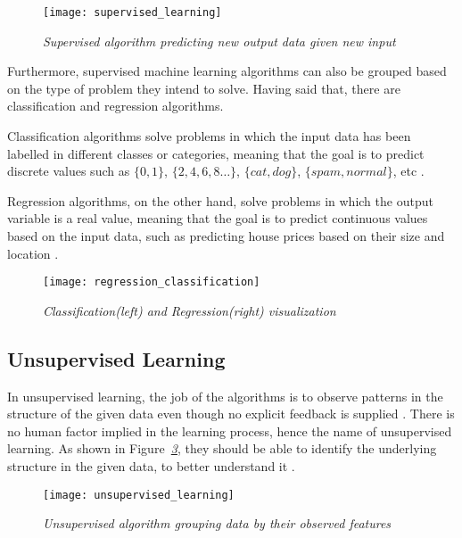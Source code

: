 \begin{figure}[h]
    \centering
    \texttt{[image: supervised\_learning]}
    \caption{\emph{Supervised algorithm predicting new output data given new input  \cite{typesML}}}
    \label{fig:supervised}
\end{figure}

Furthermore, supervised machine learning algorithms can also
be grouped based on the type of problem they intend to solve.
Having said that, there are classification and regression algorithms.

Classification algorithms solve problems in which the input data has
been labelled in different classes or categories,
meaning that the goal is to predict discrete values
such as $\{0, 1\}$, $\{2, 4, 6, 8\dots\}$, $\{cat, dog\}$, $\{spam, normal\}$, etc \cite{typesMLMedium}.

Regression algorithms, on the other hand, solve problems in which the output variable
is a real value, meaning that the goal is to predict continuous values based on the
input data, such as predicting house prices based on their size and location \cite{typesMLMedium}.

\begin{figure}[h]
    \centering
    \texttt{[image: regression\_classification]}
    \caption{\emph{Classification(left) and Regression(right) visualization  \cite{bigDataR}}}
    \label{fig:regression_classification}
\end{figure}


\subsection{Unsupervised Learning}
In unsupervised learning, the job of the algorithms is to observe patterns in
the structure of the given data even though no explicit feedback is supplied \cite{amai}.
There is no human factor implied in the learning process,
hence the name of unsupervised learning.
As shown in Figure\emph{~\ref{fig:unsupervised}}, they should be able to identify the underlying
structure in the given data, to better understand it \cite{bigDataR}.

\begin{figure}[h]
    \centering
    \texttt{[image: unsupervised\_learning]}
    \caption{\emph{Unsupervised algorithm grouping data by their observed features \cite{typesML}}}
    \label{fig:unsupervised}
\end{figure}

